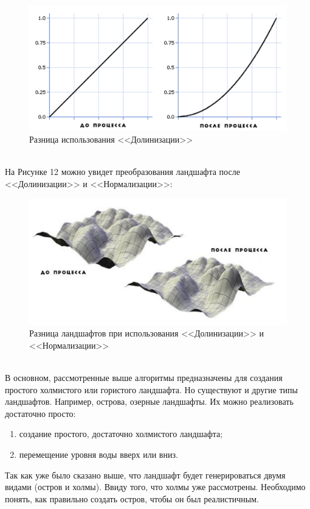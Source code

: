 \documentclass[a4paper, 10pt]{article}
\begin{document}
  \begin{figure}[h!]
  	\centering
  	\includegraphics[scale=0.9]{dol}
  	\centering\caption{Разница использования <<Долинизации>>}
  \end{figure}
	\\На Рисунке 12 можно увидет преобразования ландшафта после <<Долинизации>> и <<Нормализации>>:
	\begin{figure}[h!]
		\centering
		\includegraphics[scale=0.9]{diff}
		\centering\caption{Разница ландшафтов при использования <<Долинизации>> и <<Нормализации>> }
	\end{figure}
	\\ \hspace*{5mm}В основном, рассмотренные выше алгоритмы предназначены для создания простого холмистого или гористого ландшафта. Но существуют и другие типы ландшафтов. Например, острова, озерные ландшафты. Их можно реализовать достаточно просто:
	\begin{enumerate}
		\item создание простого, достаточно холмистого ландшафта;
		\item перемещение уровня воды вверх или вниз.
	\end{enumerate}
	\clearpage
	\newpage
	\hspace*{5mm}Так как уже было сказано выше, что ландшафт будет генерироваться двумя видами (остров и холмы). Ввиду того, что холмы уже рассмотрены. Необходимо понять, как правильно создать остров, чтобы он был реалистичным.
\end{document}
